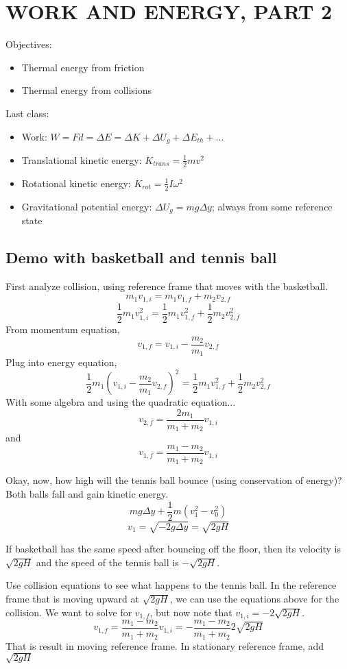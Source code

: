 \section{WORK AND ENERGY, PART 2}
Objectives:
\begin{itemize}
\item Thermal energy from friction
\item Thermal energy from collisions
  \end{itemize}

\hrulefill

Last class:
\begin{itemize}
\item Work: $W=Fd=\Delta{E}=\Delta{K}+\Delta{U_g}+\Delta{E_{th}}+...$
\item Translational kinetic energy: $K_{trans}=\frac{1}{2}mv^2$
\item Rotational kinetic energy: $K_{rot}=\frac{1}{2}I\omega^2$
\item Gravitational potential energy: $\Delta{U_g}=mg\Delta{y}$; always from some reference state
\end{itemize}

\subsection{Demo with basketball and tennis ball}
First analyze collision, using reference frame that moves with the basketball.
$$m_1v_{1,i}=m_1v_{1,f}+m_2v_{2,f}$$
$$\frac{1}{2}m_1v_{1,i}^2=\frac{1}{2}m_1v_{1,f}^2+\frac{1}{2}m_2v_{2,f}^2$$
From momentum equation,
$$v_{1,f}=v_{1,i}-\frac{m_2}{m_1}v_{2,f}$$
Plug into energy equation,
$$\frac{1}{2}m_1\left(v_{1,i}-\frac{m_2}{m_1}v_{2,f}\right)^2=\frac{1}{2}m_1v_{1,f}^2+\frac{1}{2}m_2v_{2,f}^2$$
With some algebra and using the quadratic equation...
$$\boxed{v_{2,f}=\frac{2m_1}{m_1+m_2}v_{1,i}}$$
and
$$\boxed{v_{1,f}=\frac{m_1-m_2}{m_1+m_2}v_{1,i}}$$

Okay, now, how high will the tennis ball bounce (using conservation of energy)? Both balls fall and gain kinetic energy.
$$mg\Delta y + \frac{1}{2}m\left(v_1^2-v_0^2\right)$$
$$v_1 = \sqrt{-2g\Delta y} = \sqrt{2gH}$$

If basketball has the same speed after bouncing off the floor, then its velocity is $\sqrt{2gH}$ and the speed of the tennis ball is $-\sqrt{2gH}$.

Use collision equations to see what happens to the tennis ball. In the reference frame that is moving upward at $\sqrt{2gH}$, we can use the equations above for the collision. We want to solve for $v_{1,f}$, but now note that $v_{1,i}=-2\sqrt{2gH}$.
$$v_{1,f}=\frac{m_1-m_2}{m_1+m_2}v_{1,i}=-\frac{m_1-m_2}{m_1+m_2}2\sqrt{2gH}$$
That is result in moving reference frame. In stationary reference frame, add $\sqrt{2gH}$

